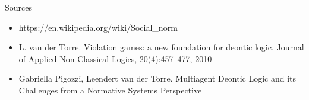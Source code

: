 \documentclass[10pt]{beamer}
\begin{document}
\begin{frame}[fragile]{Sources}
\begin{itemize}
    \item https://en.wikipedia.org/wiki/Social\_norm
    \item L. van der Torre. Violation games: a new foundation for deontic logic.
Journal of Applied Non-Classical Logics, 20(4):457–477, 2010
    \item Gabriella Pigozzi, Leendert van der Torre. Multiagent Deontic Logic
and its Challenges from a Normative Systems Perspective
\end{itemize}
\end{frame}
\end{document}
